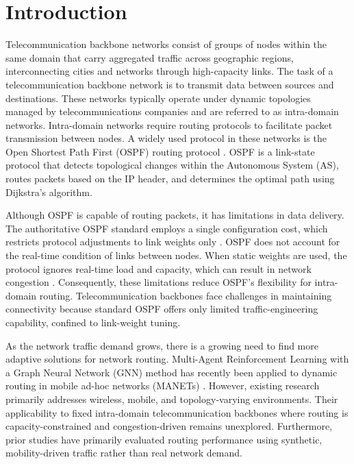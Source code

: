 \section{Introduction} %
Telecommunication backbone networks consist of groups of nodes within the same domain that carry aggregated traffic across geographic regions, interconnecting cities and networks through high-capacity links. The task of a telecommunication backbone network is to transmit data between sources and destinations. These networks typically operate under dynamic topologies managed by telecommunications companies and are referred to as intra-domain networks. Intra-domain networks require routing protocols to facilitate packet transmission between nodes. A widely used protocol in these networks is the Open Shortest Path First (OSPF) routing protocol \cite{rfc2328}. OSPF is a link-state protocol that detects topological changes within the Autonomous System (AS), routes packets based on the IP header, and determines the optimal path using Dijkstra's algorithm.

Although OSPF is capable of routing packets, it has limitations in data delivery. The authoritative OSPF standard employs a single configuration cost, which restricts protocol adjustments to link weights only \cite{rfc2328}. OSPF does not account for the real-time condition of links between nodes. When static weights are used, the protocol ignores real-time load and capacity, which can result in network congestion \cite{1039866}. Consequently, these limitations reduce OSPF's flexibility for intra-domain routing. Telecommunication backbones face challenges in maintaining connectivity because standard OSPF offers only limited traffic-engineering capability, confined to link-weight tuning.


As the network traffic demand grows, there is a growing need to find more adaptive solutions for network routing. Multi-Agent Reinforcement Learning with a Graph Neural Network (GNN) method has recently been applied to dynamic routing in mobile ad-hoc networks (MANETs) \cite{11134361}. However, existing research primarily addresses wireless, mobile, and topology-varying environments. Their applicability to fixed intra-domain telecommunication backbones where routing is capacity-constrained and congestion-driven remains unexplored. Furthermore, prior studies have primarily evaluated routing performance using synthetic, mobility-driven traffic rather than real network demand.

